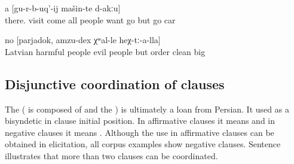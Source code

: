 \begin{exe}
	\ex	\label{ex:‎There all the people who came want to leave, but there are no cars to leave}
	\gll	[hextːu-b	šːatːir	sa-b-ač'-ib-te	li<b>il=ra	χalq'	b-ikː-ul	ca-b	gu-r-b-uq'-aˁnaj]		a	[gu-r-b-uq'-ij	mašin-te	d-akːu]\\
		there.	visit	come 	all	people	want		go	but	go	car	\\
	\glt	{}

	\ex	\label{ex:‎‎‎The Latvian people were harmful, they were bad people, but order, cleanness is great among them}
	\gll	[latiši	wredni	χalq'=de,	wahi	χalq'=de]	no	[parjadok,	amzu-dex	χʷal-le	heχ-tː-a-lla]\\
		Latvian	harmful	people	evil	people	but	order	clean	big	\\
	\glt	{}
\end{exe}



\subsection{Disjunctive coordination of clauses}
\label{ssec:Disjunctive coordination of clauses}

The   ( is composed of  and the  ) is ultimately a loan from Persian. It used as a bisyndetic  in clause initial position. In affirmative clauses it means  and in negative clauses it means . Although the use in affirmative clauses can be obtained in elicitation, all corpus examples show negative clauses. Sentence  illustrates that more than two clauses can be coordinated.

